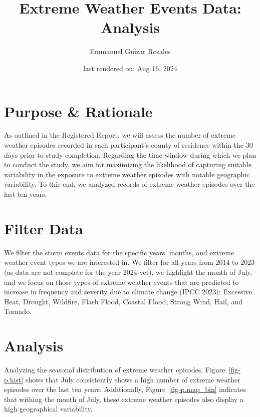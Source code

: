 \documentclass[
  letterpaper,
  DIV=11,
  numbers=noendperiod]{scrartcl}
\title{Extreme Weather Events Data: Analysis}
\author{Emmanuel Guizar Rosales}
\date{last rendered on: Aug 16, 2024}
\renewcommand*\contentsname{Table of contents}
\newcommand\contentsname{Table of contents}
\begin{document}
\maketitle

\renewcommand*\contentsname{Table of contents}
{
\hypersetup{linkcolor=}
\setcounter{tocdepth}{5}
\tableofcontents
}
\section{Purpose \& Rationale}\label{purpose-rationale}

As outlined in the Registered Report, we will assess the number of
extreme weather episodes recorded in each participant's county of
residence within the 30 days prior to study completion. Regarding the
time window during which we plan to conduct the study, we aim for
maximizing the likelihood of capturing suitable variability in the
exposure to extreme weather episodes with notable geographic
variability. To this end, we analyzed records of extreme weather
episodes over the last ten years.

\section{Filter Data}\label{filter-data}

We filter the storm events data for the specific years, months, and
extreme weather event types we are interested in. We filter for all
years from 2014 to 2023 (as data are not complete for the year 2024
yet), we highlight the month of July, and we focus on those types of
extreme weather events that are predicted to increase in frequency and
severity due to climate change (IPCC 2023): Excessive Heat, Drought,
Wildfire, Flash Flood, Coastal Flood, Strong Wind, Hail, and Tornado.

\section{Analysis}\label{analysis}

Analyzing the seasonal distribution of extreme weather episodes,
Figure~\ref{fig-p.hist} shows that July consistently shows a high number
of extreme weather episodes over the last ten years. Additionally,
Figure~\ref{fig-p.map_bin} indicates that withing the month of July,
these extreme weather episodes also display a high geographical
variability.
\end{document}
